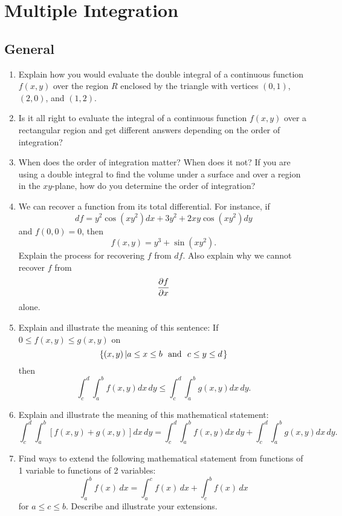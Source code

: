 \chapter{Multiple Integration}   
\section{General}
\begin{enumerate}    

\item  Explain how you would evaluate the double integral of a continuous function $f(x, y)$ over the region $R$ enclosed by the triangle with vertices $(0, 1)$, $(2, 0)$, and $(1, 2)$.  \cite{FWG}  

\item  Is it all right to evaluate the integral of a continuous function $f(x, y)$ over a rectangular region and get different answers depending on the order of integration?  \cite{FWG}  

\item  When does the order of integration matter?  When does it not?  If you are using a double integral to find the volume under a surface and over a region in the $xy$-plane, how do you determine the order of integration?  

\item  We can recover a function from its total differential.  For instance, if $$ df = y^2 \cos \left( {xy^2 } \right)dx + 3y^2  + 2xy\cos \left( {xy^2 } \right)dy $$  and $f(0, 0) = 0$, then $$ f\left( {x,y} \right) = y^3  + \sin \left( {xy^2 } \right) .$$  Explain the process for recovering $f$ from $df$.  Also explain why we cannot recover $f$ from $$ {{\partial f} \over {\partial x}} $$  alone.  

\item  Explain and illustrate the meaning of this sentence:  If $0 \le f(x, y) \le g(x, y)$ on $$ \left\{ {(x,y)\left| {a \le x \le b\ \ {\rm{ and }}\ \ c \le y \le d} \right.} \right\} $$  then $$ \int_c^d {\int_a^b {f(x,y)dx} } \,dy \le \int_c^d {\int_a^b {g(x,y)dx} } \,dy .$$  

\item  Explain and illustrate the meaning of this mathematical statement: $$ \int_c^d {\int_a^b {\left[ {f(x,y) + g(x,y)} \right]dx} } \,dy = \int_c^d {\int_a^b {f(x,y)dx} } \,dy + \int_c^d {\int_a^b {g(x,y)dx} } \,dy .$$  

\item  Find ways to extend the following mathematical statement from functions of 1 variable to functions of 2 variables:  $$ \int_a^b {f(x)\,dx}  = \int_a^c {f(x)\,dx}  + \int_c^b {f(x)\,dx}  $$  for $a \le c \le b$.  Describe and illustrate your extensions.  


\end{enumerate}
